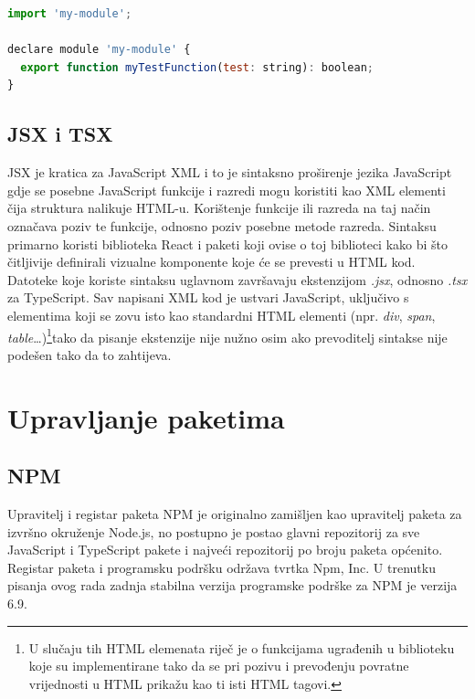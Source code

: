 \documentclass[times, utf8, diplomski, numeric]{fer}
\newcommand{\razmakp}{\vspace{18pt}}
\newcommand{\razmaks}{\vspace{10pt}}
\begin{document}
\razmakp %
\begin{lstlisting}[language=JavaScript, caption={Primjer deklaracijske datoteke}, label={lst:declaration_file}]
import 'my-module';

declare module 'my-module' {
  export function myTestFunction(test: string): boolean;
}
\end{lstlisting}
\razmaks


\subsection{JSX i TSX}

JSX je kratica za JavaScript XML i to je sintaksno proširenje jezika JavaScript gdje se posebne JavaScript funkcije i razredi mogu koristiti kao XML elementi čija struktura nalikuje HTML-u\citep{jsx_spec}.
Korištenje funkcije ili razreda na taj način označava poziv te funkcije, odnosno poziv posebne metode razreda. Sintaksu primarno koristi biblioteka React i paketi koji ovise o toj biblioteci kako bi što čitljivije definirali vizualne komponente koje će se prevesti u HTML kod\citep{react_docs}.
Datoteke koje koriste sintaksu uglavnom završavaju ekstenzijom \emph{.jsx}, odnosno \emph{.tsx} za TypeScript\citep{ts_hand}.
Sav napisani XML kod je ustvari JavaScript, uključivo s elementima koji se zovu isto kao standardni HTML elementi (npr. \emph{div}, \emph{span}, \emph{table}…)\footnote{
    U slučaju tih HTML elemenata riječ je o funkcijama ugrađenih u biblioteku koje su implementirane tako da se pri pozivu i prevođenju povratne vrijednosti u HTML prikažu kao ti isti HTML tagovi.
}tako da pisanje ekstenzije nije nužno osim ako prevoditelj sintakse nije podešen tako da to zahtijeva.


\newpage
\section{Upravljanje paketima}

\subsection{NPM}

Upravitelj i registar paketa NPM je originalno zamišljen kao upravitelj paketa za izvršno okruženje Node.js, no postupno je postao glavni repozitorij za sve JavaScript i TypeScript pakete i najveći repozitorij po broju paketa općenito\citep{med_npm_stats}.
Registar paketa i programsku podršku održava tvrtka Npm, Inc.
U trenutku pisanja ovog rada zadnja stabilna verzija programske podrške za NPM je verzija 6.9\citep{wiki_npm}.
\end{document}
